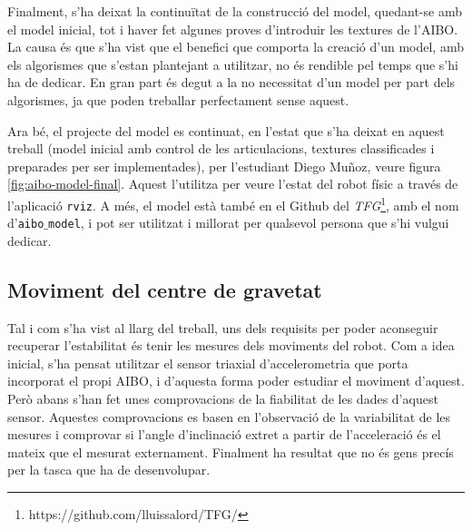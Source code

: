 \documentclass[12pt,a4paper,final,twoside]{article}
\begin{document}

Finalment, s'ha deixat la continuïtat de la construcció del model, quedant-se amb el model inicial, tot i haver fet algunes proves d'introduir les textures de l'AIBO. La causa és que s'ha vist que el benefici que comporta la creació d'un model, amb els algorismes que s'estan plantejant a utilitzar, no és rendible pel temps que s'hi ha de dedicar. En gran part és degut a la no necessitat d'un model per part dels algorismes, ja que poden treballar perfectament sense aquest.

Ara bé, el projecte del model es continuat, en l'estat que s'ha deixat en aquest treball (model inicial amb control de les articulacions, textures classificades i preparades per ser implementades), per l'estudiant Diego Muñoz, veure figura \ref{fig:aibo-model-final}. Aquest l'utilitza per veure l'estat del robot físic a través de l'aplicació \texttt{rviz}. A més, el model està també en el Github del \textit{TFG}\footnote{https://github.com/lluissalord/TFG/}, amb el nom d'\texttt{aibo$\_$model}, i pot ser utilitzat i millorat per qualsevol persona que s'hi vulgui dedicar.


\subsection{Moviment del centre de gravetat}



Tal i com s'ha vist al llarg del treball, uns dels requisits per poder aconseguir recuperar l'estabilitat és tenir les mesures dels moviments del robot. Com a idea inicial, s'ha pensat utilitzar el sensor triaxial d'accelerometria que porta incorporat el propi AIBO, i d'aquesta forma poder estudiar el moviment d'aquest. Però abans s'han fet unes comprovacions de la fiabilitat de les dades d'aquest sensor. Aquestes comprovacions es basen en l'observació de la variabilitat de les mesures i comprovar si l'angle d'inclinació extret a partir de l'acceleració és el mateix que el mesurat externament. Finalment ha resultat que no és gens precís per la tasca que ha de desenvolupar.
\end{document}
